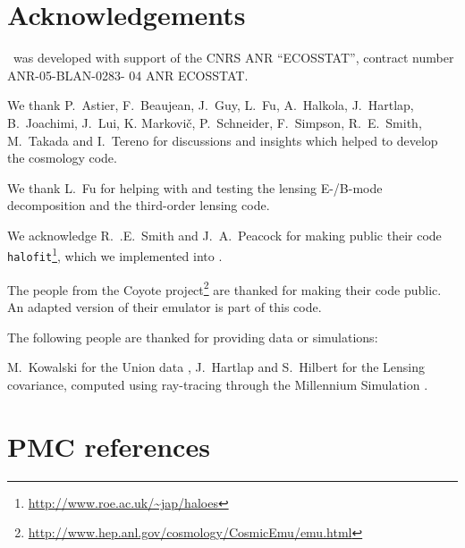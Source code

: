 \documentclass[11pt, chapterprefix, headsepline]{scrartcl}
\begin{document}
\section*{Acknowledgements}

\CosmoPMC\ was developed with support of the CNRS ANR “ECOSSTAT”,
contract number ANR-05-BLAN-0283- 04 ANR ECOSSTAT.

We thank P.~Astier, F.~Beaujean, J.~Guy, L.~Fu, A.~Halkola, J.~Hartlap,
B.~Joachimi, J.~Lui, K. Markovi\v{c}, P.~Schneider, F.~Simpson,
R.~E.~Smith, M.~Takada and I.~Tereno for discussions and insights
which helped to develop the cosmology code.

\medskip

We thank L.~Fu for helping with and testing the lensing E-/B-mode
decomposition and the third-order lensing code.

We acknowledge R.~.E.~Smith and J.~A.~Peacock for making public their
code
\texttt{halofit}\footnote{\url{http://www.roe.ac.uk/~jap/haloes}},
which we implemented into \CosmoPMC. 

The people from the Coyote
project\footnote{\url{http://www.hep.anl.gov/cosmology/CosmicEmu/emu.html}}
are thanked for making their code public. An adapted version
of their emulator is part of this code.

\medskip

The following people are thanked for providing data or simulations:

M.~Kowalski for the Union data \citep{kowalski-2008}, J.~Hartlap and S.~Hilbert
for the Lensing covariance, computed using ray-tracing
through the Millennium Simulation \citep{SHJKS09}.


\section*{PMC references}
\end{document}
